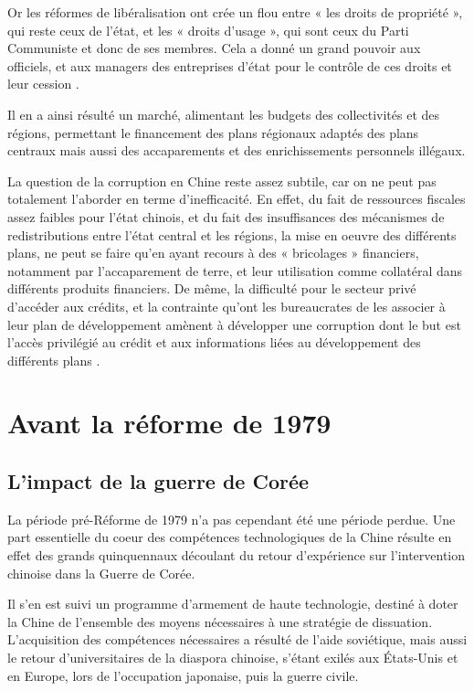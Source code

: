 \documentclass[a4paper]{article}
\begin{document}
Or les réformes de libéralisation ont crée un flou entre « les droits de propriété », qui reste ceux de l’état, et les « droits d’usage », qui sont ceux du Parti Communiste et donc de ses membres. Cela a donné un grand pouvoir aux officiels, et aux managers des entreprises d’état pour le contrôle de ces droits et leur cession \cite{pei16_chinas}.

Il en a ainsi résulté un marché, alimentant les budgets des collectivités et des régions, permettant le financement des plans régionaux adaptés des plans centraux mais aussi des accaparements et des enrichissements personnels illégaux.

La question de la corruption en Chine reste assez subtile, car on ne peut pas totalement l’aborder en terme d’inefficacité. En effet, du fait de ressources fiscales assez faibles pour l’état chinois, et du fait des insuffisances des mécanismes de redistributions entre l’état central et les régions, la mise en oeuvre des différents plans, ne peut se faire qu’en ayant recours à des « bricolages » financiers, notamment par l’accaparement de terre, et leur utilisation comme collatéral dans différents produits financiers. De même, la difficulté pour le secteur privé d’accéder aux crédits, et la contrainte qu’ont les bureaucrates de les associer à leur plan de développement amènent à développer une corruption dont le but est l’accès privilégié au crédit et aux informations liées au développement des différents plans \cite{ang20_chinas}. 

\section{Avant la réforme de 1979}
\label{sec:org112d285}
\subsection{L’impact de la guerre de Corée}
\label{sec:org77dd9e3}
La période pré-Réforme de 1979 n’a pas cependant été une période perdue. Une part essentielle du coeur des compétences technologiques de la Chine résulte en effet des grands quinquennaux découlant du retour d’expérience sur l’intervention chinoise dans la Guerre de Corée.

Il s’en est suivi un programme d’armement de haute technologie, destiné à doter la Chine de l’ensemble des moyens nécessaires à une stratégie de dissuation. L’acquisition des compétences nécessaires a résulté de l’aide soviétique, mais aussi le retour d’universitaires de la diaspora chinoise, s’étant exilés aux États-Unis et en Europe, lors de l’occupation japonaise, puis la guerre civile.
\end{document}
